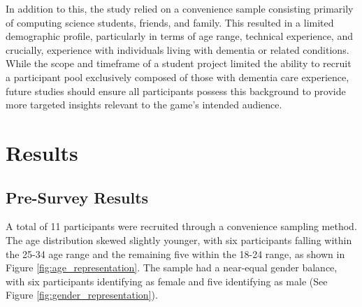 \documentclass{l4proj}
\begin{document}
In addition to this, the study relied on a convenience sample consisting primarily of computing science students, friends, and family. This resulted in a limited demographic profile, particularly in terms of age range, technical experience, and crucially, experience with individuals living with dementia or related conditions. While the scope and timeframe of a student project limited the ability to recruit a participant pool exclusively composed of those with dementia care experience, future studies should ensure all participants possess this background to provide more targeted insights relevant to the game's intended audience.

\section{Results}

\subsection{Pre-Survey Results}
A total of 11 participants were recruited through a convenience sampling method.  The age distribution skewed slightly younger, with six participants falling within the 25-34 age range and the remaining five within the 18-24 range, as shown in Figure \ref{fig:age_representation}. The sample had a near-equal gender balance, with six participants identifying as female and five identifying as male (See Figure \ref{fig:gender_representation}).
\end{document}

